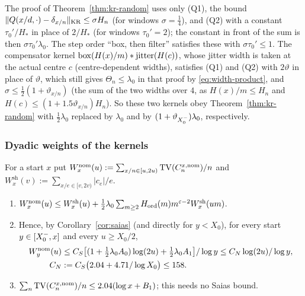 \begin{remark}\label{rem:kr-variants}
The proof of Theorem~\ref{thm:kr-random} uses only (Q1), the bound $\lVert Q(x/d,\cdot)-\delta_{x/n}\rVert_{\mathrm{KR}}\le\sigma H_n$ (for windows
$\sigma=\frac14$), and (Q2) with a constant $\tau_0'/H_*$ in place of $2/H_*$ (for windows $\tau_0'=2$); the constant in front
of the sum is then $\sigma\tau_0'\lambda_0$. The step order ``box, then filter'' satisfies these with $\sigma\tau_0'\le1$. The
compensator kernel $\mathrm{box}(H(x)/m)*\mathrm{jitter}(H(c))$, whose jitter width is taken at the actual centre $c$ (centre-dependent
widths), satisfies (Q1) and (Q2) with $2\vartheta$ in place of $\vartheta$, which still gives $\Theta_n\le\lambda_0$ in that
proof by \eqref{eq:width-product}, and $\sigma\le\frac12(1+\vartheta_{x/n})$ (the sum of the two widths over $4$, as
$H(x)/m\le H_n$ and $H(c)\le(1+1.5\vartheta_{x/n})H_n$). So these two kernels obey Theorem~\ref{thm:kr-random} with
$\frac12\lambda_0$ replaced by $\lambda_0$ and by $(1+\vartheta_{X_0^{-}})\lambda_0$, respectively.
\end{remark}

\subsubsection{Dyadic weights of the kernels}\label{sec:kr-weights}

\begin{corollary}\label{cor:kr-weights}
For a start $x$ put $W^{\mathrm{nom}}_x(u):=\sum_{x/n\in[u,2u)}\operatorname{TV}(C_n^{x,\mathrm{nom}})/n$ and $W^{\mathrm{sh}}_x(v):=\sum_{x/e\in[v,2v)}|c_e|/e$.
\begin{enumerate}[label=(\alph*)]
\item $W^{\mathrm{nom}}_x(u)\le W^{\mathrm{sh}}_x(u)+\frac12\lambda_0\sum_{m\ge2}H_{\mathrm{ord}}(m)m^{\varepsilon-2}W^{\mathrm{sh}}_x(um)$.
\item Hence, by Corollary~\ref{cor:saias} (and directly for $y<X_0$), for every start $y\in[X_0^{-},x]$ and every $u\ge X_0/2$,
  \[
  \begin{aligned}
    W^{\mathrm{nom}}_y(u)&\le C_S\bigl[(1+\tfrac12\lambda_0A_0)\log(2u)+\tfrac12\lambda_0A_1\bigr]/\log y\le C_N\log(2u)/\log y,\\
    C_N&:=C_S\bigl(2.04+4.71/\log X_0\bigr)\le158 .
  \end{aligned}
  \]
\item $\sum_n\operatorname{TV}(C_n^{x,\mathrm{nom}})/n\le2.04(\log x+B_1)$; this needs no Saias bound.
\end{enumerate}
\end{corollary}

